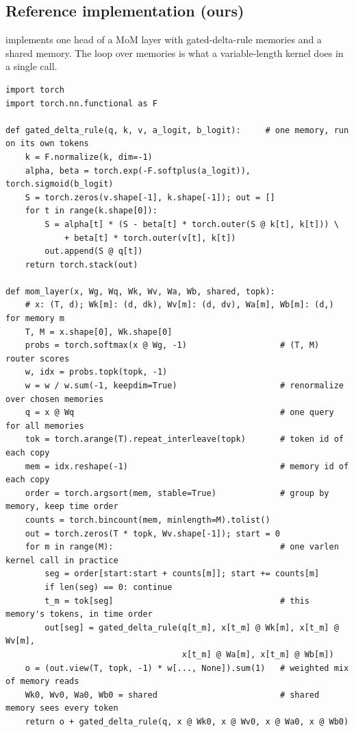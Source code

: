 \subsection{Reference implementation (ours)}

 implements one head of a MoM layer with gated-delta-rule memories and a
shared memory. The loop over memories is what a variable-length kernel does in a single call.

\begin{lstlisting}[caption={Reference implementation (ours): a Mixture-of-Memories layer by token reordering.},label={lst:c07-mom}]
import torch
import torch.nn.functional as F

def gated_delta_rule(q, k, v, a_logit, b_logit):     # one memory, run on its own tokens
    k = F.normalize(k, dim=-1)
    alpha, beta = torch.exp(-F.softplus(a_logit)), torch.sigmoid(b_logit)
    S = torch.zeros(v.shape[-1], k.shape[-1]); out = []
    for t in range(k.shape[0]):
        S = alpha[t] * (S - beta[t] * torch.outer(S @ k[t], k[t])) \
            + beta[t] * torch.outer(v[t], k[t])
        out.append(S @ q[t])
    return torch.stack(out)

def mom_layer(x, Wg, Wq, Wk, Wv, Wa, Wb, shared, topk):
    # x: (T, d); Wk[m]: (d, dk), Wv[m]: (d, dv), Wa[m], Wb[m]: (d,) for memory m
    T, M = x.shape[0], Wk.shape[0]
    probs = torch.softmax(x @ Wg, -1)                   # (T, M) router scores
    w, idx = probs.topk(topk, -1)
    w = w / w.sum(-1, keepdim=True)                     # renormalize over chosen memories
    q = x @ Wq                                          # one query for all memories
    tok = torch.arange(T).repeat_interleave(topk)       # token id of each copy
    mem = idx.reshape(-1)                               # memory id of each copy
    order = torch.argsort(mem, stable=True)             # group by memory, keep time order
    counts = torch.bincount(mem, minlength=M).tolist()
    out = torch.zeros(T * topk, Wv.shape[-1]); start = 0
    for m in range(M):                                  # one varlen kernel call in practice
        seg = order[start:start + counts[m]]; start += counts[m]
        if len(seg) == 0: continue
        t_m = tok[seg]                                  # this memory's tokens, in time order
        out[seg] = gated_delta_rule(q[t_m], x[t_m] @ Wk[m], x[t_m] @ Wv[m],
                                    x[t_m] @ Wa[m], x[t_m] @ Wb[m])
    o = (out.view(T, topk, -1) * w[..., None]).sum(1)   # weighted mix of memory reads
    Wk0, Wv0, Wa0, Wb0 = shared                         # shared memory sees every token
    return o + gated_delta_rule(q, x @ Wk0, x @ Wv0, x @ Wa0, x @ Wb0)
\end{lstlisting}

